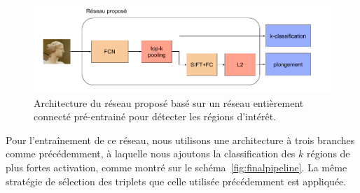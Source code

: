\begin{figure}[!htb]
\centering
    \includegraphics[width=\linewidth]{figures/ProposedNetwork.png}
    \caption{Architecture du réseau proposé basé sur un réseau entièrement connecté pré-entrainé pour détecter les régions d'intérêt.
    \label{fig:proposednetwork}}
\end{figure}

Pour l'entraînement de ce réseau, nous utilisons une architecture à trois branches comme précédemment, à laquelle nous ajoutons la classification des $k$ régions de plus fortes activation, comme montré sur le schéma~\ref{fig:finalpipeline}.
La même stratégie de sélection des triplets que celle utilisée précédemment est appliquée.


